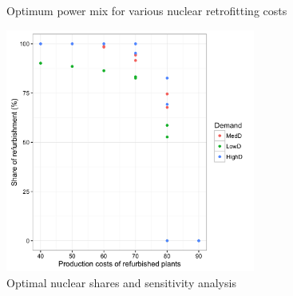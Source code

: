 \begin{figure}
	\centering
	\caption{Optimum power mix for various nuclear retrofitting costs}
\end{figure}


\begin{figure}[!ht]
	\centering
	\includegraphics[height=8cm]{figures/powerMixSensitivity.png}
	\caption{Optimal nuclear shares and sensitivity analysis}
	\label{fig:powerMixSensitivity}
\end{figure}


